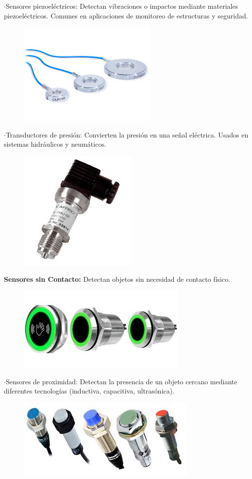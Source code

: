 \newpage
	$\cdot$Sensores piezoeléctricos: Detectan vibraciones o impactos mediante materiales piezoeléctricos. Comunes en aplicaciones de monitoreo de estructuras y seguridad.


\begin{figure} [h]
	\centering
	\includegraphics[width=0.3\linewidth]{img/sensorespiezoelectrico}
	\caption{}
	\label{fig:sensorespiezoelectrico}
\end{figure}


	$\cdot$Transductores de presión: Convierten la presión en una señal eléctrica. Usados en sistemas hidráulicos y neumáticos.
	
	
\begin{figure} [h]
	\centering
	\includegraphics[width=0.3\linewidth]{img/transductordepresion}
	\caption{}
	\label{fig:transductordepresion}
\end{figure}
	
	
\textbf{Sensores sin Contacto:}
	Detectan objetos sin necesidad de contacto físico.
	
		
\begin{figure} [h]
	\centering
	\includegraphics[width=0.3\linewidth]{img/sensoressincontacto}
	\caption{}
	\label{fig:sensoressincontacto}
\end{figure}
	
\newpage
	$\cdot$Sensores de proximidad: Detectan la presencia de un objeto cercano mediante diferentes tecnologías (inductiva, capacitiva, ultrasónica).
	
		
\begin{figure} [h]
	\centering
	\includegraphics[width=0.3\linewidth]{img/sensoresdeproximidad}
	\caption{}
	\label{fig:sensoresdeproximidad}
\end{figure}



